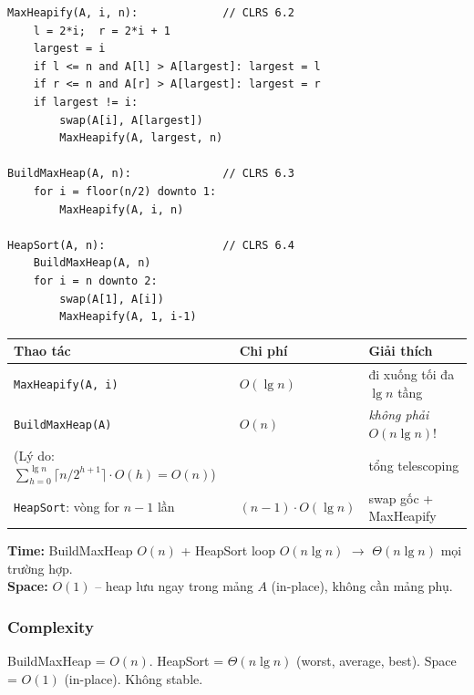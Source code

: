 \documentclass[10pt]{article}
\begin{document}
\begin{tcolorbox}[colback=gray!8, colframe=gray!50, boxrule=0.5pt, arc=2pt,
  left=6pt, right=6pt, top=4pt, bottom=4pt,
  title={\small\textbf{Pseudocode 8: Heap Sort (MaxHeapify + BuildMaxHeap + HeapSort)}}]
\begin{verbatim}
MaxHeapify(A, i, n):             // CLRS 6.2
    l = 2*i;  r = 2*i + 1
    largest = i
    if l <= n and A[l] > A[largest]: largest = l
    if r <= n and A[r] > A[largest]: largest = r
    if largest != i:
        swap(A[i], A[largest])
        MaxHeapify(A, largest, n)

BuildMaxHeap(A, n):              // CLRS 6.3
    for i = floor(n/2) downto 1:
        MaxHeapify(A, i, n)

HeapSort(A, n):                  // CLRS 6.4
    BuildMaxHeap(A, n)
    for i = n downto 2:
        swap(A[1], A[i])
        MaxHeapify(A, 1, i-1)
\end{verbatim}
\end{tcolorbox}

\begin{tcolorbox}[colback=yellow!5, colframe=orange!50, boxrule=0.5pt, arc=2pt, title={\small\textbf{Phân tích Complexity -- Heap Sort}}]
\begin{tabular}{|l|l|l|}
\hline
\textbf{Thao tác} & \textbf{Chi phí} & \textbf{Giải thích} \\
\hline
\texttt{MaxHeapify(A, i)} & $O(\lg n)$ & đi xuống tối đa $\lg n$ tầng \\
\hline
\texttt{BuildMaxHeap(A)} & $O(n)$ & \textit{không phải} $O(n\lg n)$! \\
\hline
\quad (Lý do: $\sum_{h=0}^{\lg n}\lceil n/2^{h+1}\rceil \cdot O(h) = O(n)$) & & tổng telescoping \\
\hline
\texttt{HeapSort}: vòng for $n-1$ lần & $(n-1)\cdot O(\lg n)$ & swap gốc + MaxHeapify \\
\hline
\end{tabular}
\vspace{0.2cm}

\textbf{Time:} BuildMaxHeap $O(n)$ + HeapSort loop $O(n\lg n)$ $\to$ $\Theta(n\lg n)$ mọi trường hợp.\\
\textbf{Space:} $O(1)$ -- heap lưu ngay trong mảng $A$ (in-place), không cần mảng phụ.
\end{tcolorbox}

\subsubsection{Complexity}
BuildMaxHeap = $O(n)$. HeapSort = $\Theta(n \lg n)$ (worst, average, best). Space = $O(1)$ (in-place). Không stable.
\end{document}

